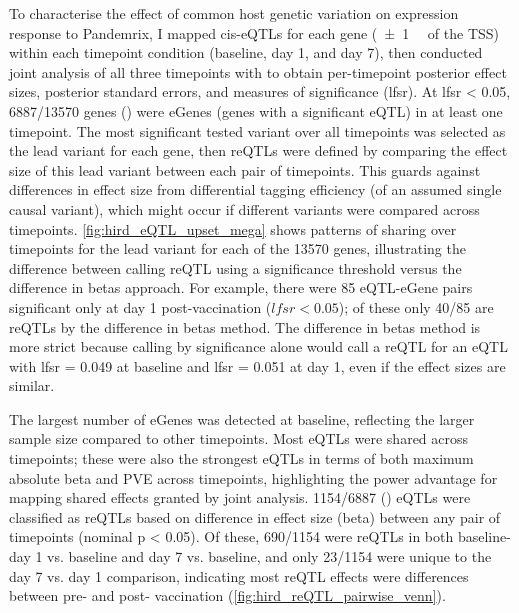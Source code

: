 To characterise the effect of common host genetic variation on expression response to Pandemrix,
I mapped cis-\glspl{eQTL} for each gene (\SI{\pm1}{\mega\bp} of the \gls{TSS}) within each timepoint condition (baseline, day 1, and day 7),
then conducted joint analysis of all three timepoints with  \autocite{urbut2018FlexibleStatisticalMethods} to obtain per-timepoint posterior effect sizes, posterior standard errors, and measures of significance (\gls{lfsr}).
At \gls{lfsr} < 0.05, \num{6887/13570} genes () were eGenes (genes with a significant \gls{eQTL}) in at least one timepoint.
The most significant tested variant over all timepoints was selected as the lead variant for each gene,
then \Glspl{reQTL} were defined by comparing the effect size of this lead variant between each pair of timepoints.
This guards against differences in effect size from differential tagging efficiency (of an assumed single causal variant), which might occur if different variants were compared across timepoints.
\cref{fig:hird_eQTL_upset_mega} shows patterns of sharing over timepoints for the lead variant for each of the \num{13570} genes,
illustrating the difference between calling \gls{reQTL} using a significance threshold versus the difference in betas approach.
For example, there were 85 \gls{eQTL}-eGene pairs significant only at day 1 post-vaccination ($lfsr < 0.05$); of these only \num{40/85} are \glspl{reQTL} by the difference in betas method.
The difference in betas method is more strict because calling by significance alone would call a \gls{reQTL} for an \gls{eQTL} with lfsr = 0.049 at baseline and lfsr = 0.051 at day 1, even if the effect sizes are similar.

The largest number of eGenes was detected at baseline, reflecting the larger sample size compared to other timepoints.
Most \glspl{eQTL} were shared across timepoints; 
these were also the strongest \glspl{eQTL} in terms of both maximum absolute beta and \gls{PVE} across timepoints, highlighting the power advantage for mapping shared effects granted by joint analysis.
\num{1154/6887} () \glspl{eQTL} were classified as \glspl{reQTL} based on difference in effect size (beta) between any pair of timepoints (nominal p < 0.05).
Of these, 
\num{690/1154} were \glspl{reQTL} in both baseline- day 1 vs. baseline and day 7 vs. baseline, 
and only \num{23/1154} were unique to the day 7 vs. day 1 comparison, 
indicating most \gls{reQTL} effects were differences between pre- and post- vaccination (\cref{fig:hird_reQTL_pairwise_venn}).


